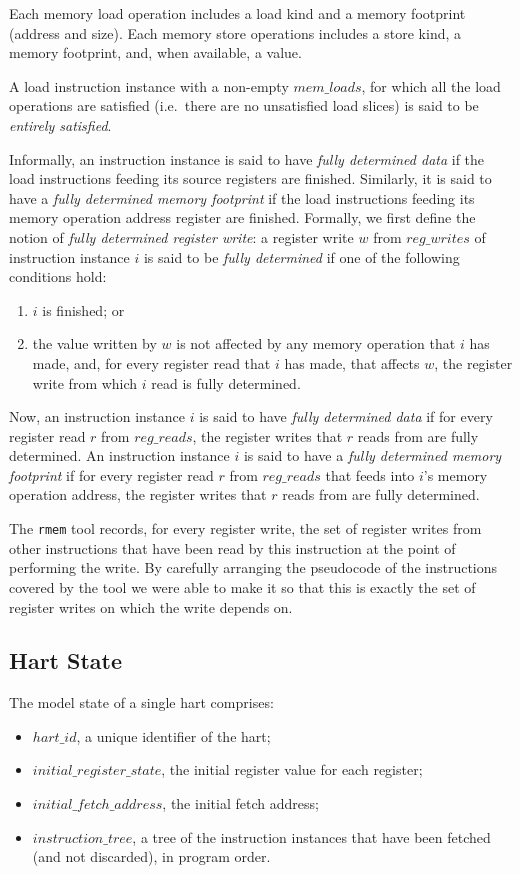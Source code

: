 Each memory load operation includes a load kind and a memory footprint (address and size).
Each memory store operations includes a store kind, a memory footprint, and, when available, a value.

A load instruction instance with a non-empty $mem\_loads$, for which all the load operations are satisfied (i.e.~there are no unsatisfied load slices) is said to be {\it entirely satisfied}.

Informally, an instruction instance is said to have {\it fully determined data} if the load instructions feeding its source registers are finished.
Similarly, it is said to have a {\it fully determined memory footprint} if the load instructions feeding its memory operation address register are finished.
%
Formally, we first define the notion of {\it fully determined register write}: a register write $w$ from $reg\_writes$ of instruction instance $i$ is said to be {\it fully determined} if one of the following conditions hold:
\begin{enumerate}
\item $i$ is finished; or
\item the value written by $w$ is not affected by any memory operation that $i$ has made, and, for every register read that $i$ has made, that affects $w$, the register write from which $i$ read is fully determined.
\end{enumerate}
Now, an instruction instance $i$ is said to have  {\it fully determined data} if for every register read $r$ from $reg\_reads$, the register writes that $r$ reads from are fully determined.
An instruction instance $i$ is said to have a {\it fully determined memory footprint} if for every register read $r$ from $reg\_reads$ that feeds into $i$'s memory operation address, the register writes that $r$ reads from are fully determined.
\begin{commentary}
The {\tt rmem} tool records, for every register write, the set of register writes from other instructions that have been read by this instruction at the point of performing the write.
By carefully arranging the pseudocode of the instructions covered by the tool we were able to make it so that this is exactly the set of register writes on which the write depends on.
\end{commentary}


\subsection{Hart State}
The model state of a single hart comprises:
\begin{itemize}
\item $hart\_id$, a unique identifier of the hart;
\item $initial\_register\_state$, the initial register value for each register;
\item $initial\_fetch\_address$, the initial fetch address;
\item $instruction\_tree$, a tree of the instruction instances that have been fetched (and not discarded), in program order.
\end{itemize}


